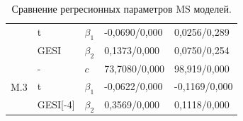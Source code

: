 \documentclass[a4paper,14pt]{extreport}
\begin{document}
\begin{table}[H]
\begin{tabular}{l|ll|ll}
		                                                      & t                                                        & $\beta_1$                                               & -0,0690/0,000                                        & 0,0256/0,289                      \\
		                                                      & GESI                                                     & $\beta_2$                                               & 0,1373/0,000                                         & 0,0750/0,254                      \\ \hline
		\multirow{3}{*}{M.3}                                  & -                                                        & $c$                                                     & 73,7080/0,000                                        & 98,919/0,000                      \\
		                                                      & t                                                        & $\beta_1$                                               & -0,0622/0,000                                        & -0,1169/0,000                     \\
		                                                      & GESI[-4]                                                 & $\beta_2$                                               & 0,3569/0,000                                         & 0,1118/0,000                      \\ \hline
	\end{tabular}
	\caption{Сравнение регресионных параметров MS моделей. }
	\label{tbl:ggdp_model_params_reg}
\end{table}
\end{document}
